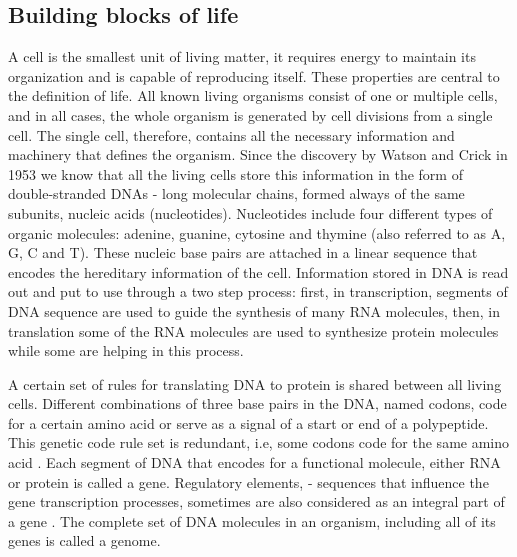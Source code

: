 \documentclass[11pt, a4paper,oneside]{report}
\begin{document}
\subsection{Building blocks of life}
A cell is the smallest unit of living matter, it requires energy to maintain its organization and is capable of reproducing itself. These properties are central to the definition of life. All known living organisms consist of one or multiple cells, and in all cases, the whole organism is generated by cell divisions from a single cell. The single cell, therefore, contains all the necessary information and machinery that defines the organism.  Since the discovery by Watson and Crick in 1953 \cite{Watson1974} we know that all the living cells store this information in the form of double-stranded DNAs -  long molecular chains, formed always of the same subunits, nucleic acids (nucleotides). Nucleotides include four different types of organic molecules: adenine, guanine, cytosine and thymine (also referred to as A, G, C and T). These nucleic base pairs are attached  in a linear sequence that encodes the hereditary information of the cell. Information stored in DNA is read out and put to use through a two step process: first, in transcription, segments of DNA sequence are used to guide the synthesis of many RNA molecules, then, in translation some of the RNA molecules are used to synthesize protein molecules while some are helping in this process.

 A certain set of rules for translating DNA to protein is shared between all living cells. Different combinations of three base pairs in the DNA, named codons, code for a certain amino acid or serve as a signal of a start or end of a polypeptide. This genetic code rule set is redundant, i.e, some codons code for the same amino acid \cite{Turanov2009}. Each segment of DNA that encodes for a functional molecule, either RNA or protein is called a gene\cite{Gerstein2007}. Regulatory elements, - sequences that influence the gene transcription processes, sometimes are also considered as an integral part of a gene \cite{lodish2001}. The complete set of DNA molecules in an organism, including all of its genes is called a genome.  
 
\end{document}
